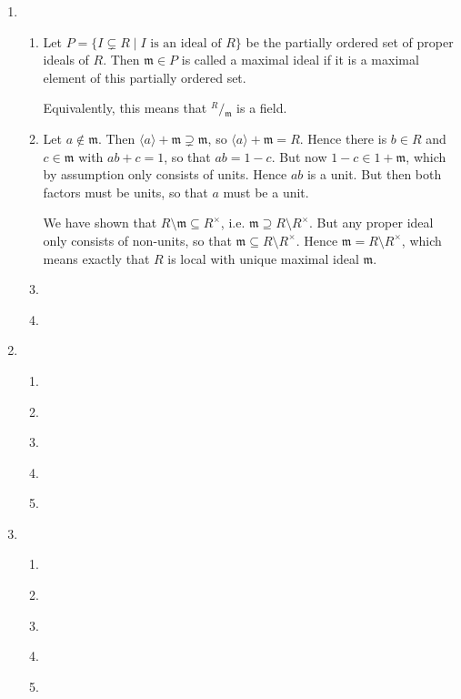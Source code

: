 \documentclass{article}
\newcommand\quotient[2]{{^{\displaystyle #1}}/{_{\displaystyle #2}}}
\begin{document}
\begin{enumerate}[style=nextline,label={Problem (\arabic*)}]
\item {
\begin{enumerate}[label={(\alph*)}]
\item {
Let $P = \{I \subsetneq R \mid I \text{ is an ideal of } R\}$ be the partially ordered set of proper ideals of $R$. Then $\mathfrak{m} \in P$ is called a maximal ideal if it is a maximal element of this partially ordered set.
\par
Equivalently, this means that $\quotient{R}{\mathfrak{m}}$ is a field.
}
\item {
Let $a \not\in \mathfrak{m}$. Then $\langle a \rangle + \mathfrak{m} \supsetneq \mathfrak{m}$, so $\langle a \rangle + \mathfrak{m} = R$. Hence there is $b \in R$ and $c \in \mathfrak{m}$ with $ab + c = 1$, so that $ab = 1 - c$. But now $1 - c \in 1 + \mathfrak{m}$, which by assumption only consists of units. Hence $ab$ is a unit. But then both factors must be units, so that $a$ must be a unit.
\par
We have shown that $R \setminus \mathfrak{m} \subseteq R^\times$, i.e. $\mathfrak{m} \supseteq R \setminus R^\times$. But any proper ideal only consists of non-units, so that $\mathfrak{m} \subseteq R \setminus R^\times$. Hence $\mathfrak{m} = R \setminus R^\times$, which means exactly that $R$ is local with unique maximal ideal $\mathfrak{m}$.
}
\item {
}
\item {
}
\end{enumerate}
}
\item {
\begin{enumerate}[label={(\alph*)}]
\item {
}
\item {
}
\item {
}
\item {
}
\item {
}
\end{enumerate}
}
\item {
\begin{enumerate}[label={(\alph*)}]
\item {
}
\item {
}
\item {
}
\item {
}
\item {
}
\end{enumerate}
}
\end{enumerate}
\end{document}
